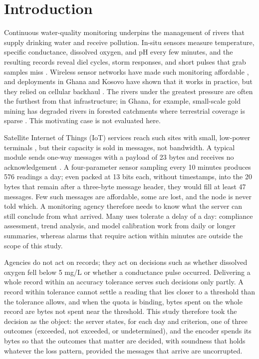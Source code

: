 \section{Introduction}
\label{sec:intro}

Continuous water-quality monitoring underpins the management of rivers that supply drinking water and receive pollution. In-situ sensors measure temperature, specific conductance, dissolved oxygen, and pH every few minutes, and the resulting records reveal diel cycles, storm responses, and short pulses that grab samples miss \citep{rode2016}. Wireless sensor networks have made such monitoring affordable \citep{adumanu2017}, and deployments in Ghana and Kosovo have shown that it works in practice, but they relied on cellular backhaul \citep{adumanu2020,ahmedi2022}. The rivers under the greatest pressure are often the furthest from that infrastructure; in Ghana, for example, small-scale gold mining has degraded rivers in forested catchments where terrestrial coverage is sparse \citep{duncan2020}. This motivating case is not evaluated here.

Satellite Internet of Things (IoT) services reach such sites with small, low-power terminals \citep{centenaro2021}, but their capacity is sold in messages, not bandwidth. A typical module sends one-way messages with a payload of 23 bytes and receives no acknowledgement \citep{kineis2023kim1}. A four-parameter sensor sampling every 10 minutes produces 576 readings a day; even packed at 13 bits each, without timestamps, into the 20 bytes that remain after a three-byte message header, they would fill at least 47 messages. Few such messages are affordable, some are lost, and the node is never told which. A monitoring agency therefore needs to know what the server can still conclude from what arrived. Many uses tolerate a delay of a day: compliance assessment, trend analysis, and model calibration work from daily or longer summaries, whereas alarms that require action within minutes are outside the scope of this study.

Agencies do not act on records; they act on decisions such as whether dissolved oxygen fell below 5 mg/L or whether a conductance pulse occurred. Delivering a whole record within an accuracy tolerance \citep{wagner2006} serves such decisions only partly. A record within tolerance cannot settle a reading that lies closer to a threshold than the tolerance allows, and when the quota is binding, bytes spent on the whole record are bytes not spent near the threshold. This study therefore took the decision as the object: the server states, for each day and criterion, one of three outcomes (exceeded, not exceeded, or undetermined), and the encoder spends its bytes so that the outcomes that matter are decided, with soundness that holds whatever the loss pattern, provided the messages that arrive are uncorrupted.

